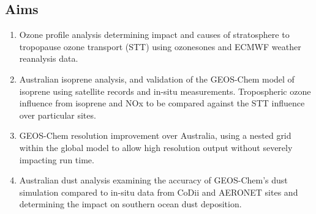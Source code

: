 
\subsection{Aims}
\begin{enumerate}
\item Ozone profile analysis determining impact and causes of stratosphere to tropopause ozone transport (STT) using ozonesones and ECMWF weather reanalysis data.
\item Australian isoprene analysis, and validation of the GEOS-Chem model of isoprene using satellite records and in-situ measurements. 
Tropospheric ozone influence from isoprene and NOx to be compared against the STT influence over particular sites. 
\item GEOS-Chem resolution improvement over Australia, using a nested grid within the global model to allow high resolution output without severely impacting run time.
\item Australian dust analysis examining the accuracy of GEOS-Chem's dust simulation compared to in-situ data from CoDii and AERONET sites and determining the impact on southern ocean dust deposition.
\end{enumerate}